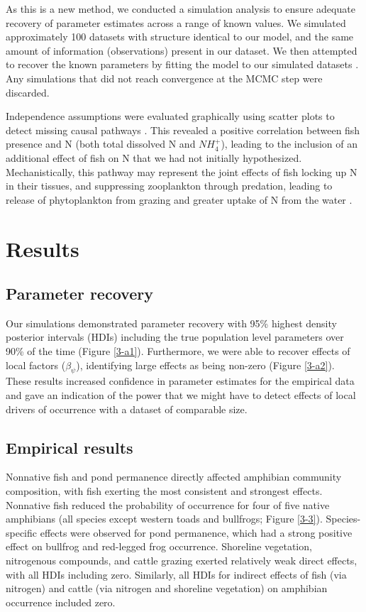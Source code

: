 As this is a new method, we conducted a simulation analysis to ensure
adequate recovery of parameter estimates across a range of known values.
We simulated approximately 100 datasets with structure identical to our
model, and the same amount of information (observations) present in our
dataset. We then attempted to recover the known parameters by fitting
the model to our simulated datasets \citep{Gimenez2012}. Any
simulations that did not reach convergence at the MCMC step were
discarded.

Independence assumptions were evaluated graphically using scatter plots
to detect missing causal pathways \citep{Grace2012}. This revealed a
positive correlation between fish presence and N (both total dissolved N
and $NH_4^+$), leading to the inclusion of an additional effect of fish
on N that we had not initially hypothesized. Mechanistically, this
pathway may represent the joint effects of fish locking up N in their
tissues, and suppressing zooplankton through predation, leading to
release of phytoplankton from grazing and greater uptake of N from the
water \citep{Andersson1978, Henrikson1980}.

\section{Results}

\subsection{Parameter recovery}

Our simulations demonstrated parameter recovery with 95\% highest
density posterior intervals (HDIs) including the true population level
parameters over 90\% of the time (Figure \ref{3-a1}). Furthermore, we were able
to recover effects of local factors ($\beta_\psi$), identifying large
effects as being non-zero (Figure \ref{3-a2}). These results increased
confidence in parameter estimates for the empirical data and gave an
indication of the power that we might have to detect effects of local
drivers of occurrence with a dataset of comparable size.

\subsection{Empirical results}

Nonnative fish and pond permanence directly affected amphibian community
composition, with fish exerting the most consistent and strongest
effects. Nonnative fish reduced the probability of occurrence for four
of five native amphibians (all species except western toads and
bullfrogs; Figure \ref{3-3}). Species-specific effects were observed for pond
permanence, which had a strong positive effect on bullfrog and
red-legged frog occurrence. Shoreline vegetation, nitrogenous compounds,
and cattle grazing exerted relatively weak direct effects, with all HDIs
including zero. Similarly, all HDIs for indirect effects of fish (via
nitrogen) and cattle (via nitrogen and shoreline vegetation) on
amphibian occurrence included zero.

